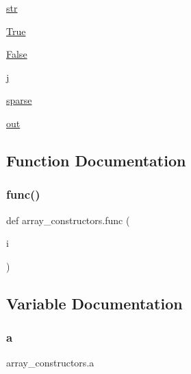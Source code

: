 \begin{DoxyCompactItemize}
\hyperlink{namespacearray__constructors_ac2911ea7eafcbbddba8d591b0aae1666}{str}
\item 
\hyperlink{namespacearray__constructors_a891172e3849d88d65f9c78a697654b83}{True}
\item 
\hyperlink{namespacearray__constructors_a049768f59e6844baa772242eef5f0ead}{False}
\item 
\hyperlink{namespacearray__constructors_ad694f9e8ff9373af12619788da50f7d9}{j}
\item 
\hyperlink{namespacearray__constructors_a987b4b9b01c6efee84d86c8a4f322b69}{sparse}
\item 
\hyperlink{namespacearray__constructors_a6747714592e7c545c538794f57f9ce34}{out}
\end{DoxyCompactItemize}


\subsection{Function Documentation}
\mbox{\label{namespacearray__constructors_ab09f915c34699a2a5cfd01d6b5921a22}} 
\subsubsection{\texorpdfstring{func()}{func()}}
{\footnotesize\ttfamily def array\+\_\+constructors.\+func (\begin{DoxyParamCaption}\item[{}]{i }\end{DoxyParamCaption})}



\subsection{Variable Documentation}
\mbox{\label{namespacearray__constructors_a0133900180f6657bd97fb329a644e6d7}} 
\subsubsection{\texorpdfstring{a}{a}}
{\footnotesize\ttfamily array\+\_\+constructors.\+a}

